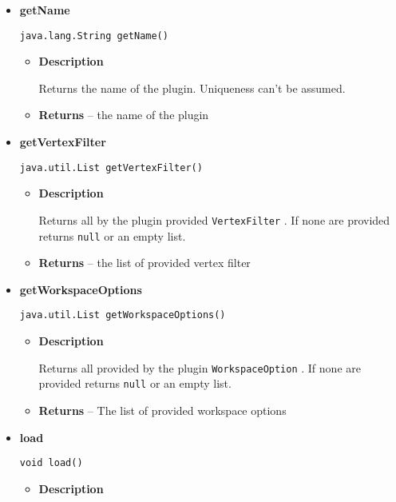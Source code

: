 {{{{{{{{{\begin{itemize}
{\begin{itemize}
{Returns all by the plugin provided \texttt{\small Importer}{\small 
{}}. If none are provided returns \texttt{\small null} or an empty list.
}
\item{{\bf  Returns} -- 
a list of provided importer 
}%
\end{itemize}
}%
\item{ 
{\bf  getName}\\
\begin{lstlisting}[frame=none]
java.lang.String getName()\end{lstlisting} %
\begin{itemize}
\item{
{\bf  Description}

Returns the name of the plugin. Uniqueness can't be assumed.
}
\item{{\bf  Returns} -- 
the name of the plugin 
}%
\end{itemize}
}%
\item{ 
{\bf  getVertexFilter}\\
\begin{lstlisting}[frame=none]
java.util.List getVertexFilter()\end{lstlisting} %
\begin{itemize}
\item{
{\bf  Description}

Returns all by the plugin provided \texttt{\small VertexFilter}{\small 
{}}. If none are provided returns \texttt{\small null} or an empty list.
}
\item{{\bf  Returns} -- 
the list of provided vertex filter 
}%
\end{itemize}
}%
\item{ 
{\bf  getWorkspaceOptions}\\
\begin{lstlisting}[frame=none]
java.util.List getWorkspaceOptions()\end{lstlisting} %
\begin{itemize}
\item{
{\bf  Description}

Returns all provided by the plugin \texttt{\small WorkspaceOption}{\small 
{}}. If none are provided returns \texttt{\small null} or an empty list.
}
\item{{\bf  Returns} -- 
The list of provided workspace options 
}%
\end{itemize}
}%
\item{ 
{\bf  load}\\
\begin{lstlisting}[frame=none]
void load()\end{lstlisting} %
\begin{itemize}
\item{
{\bf  Description}

}
\end{itemize}}
\end{itemize}}}}}}}}}}
